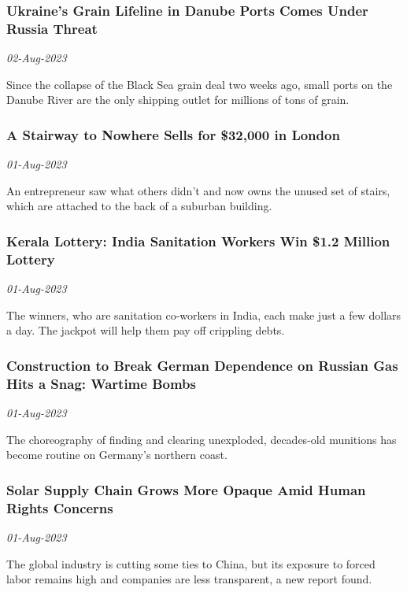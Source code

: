 \subsubsection{Ukraine’s Grain Lifeline in Danube Ports Comes Under Russia Threat \href{https://www.nytimes.com/2023/08/01/world/europe/ukraine-grain-danube-ports-russia.html}{}}
\textit{02-Aug-2023}

Since the collapse of the Black Sea grain deal two weeks ago, small ports on the Danube River are the only shipping outlet for millions of tons of grain.
\subsubsection{A Stairway to Nowhere Sells for \$32,000 in London \href{https://www.nytimes.com/2023/08/01/world/europe/stairwell-auction-25k-pounds.html}{}}
\textit{01-Aug-2023}

An entrepreneur saw what others didn’t and now owns the unused set of stairs, which are attached to the back of a suburban building.
\subsubsection{Kerala Lottery: India Sanitation Workers Win \$1.2 Million Lottery \href{https://www.nytimes.com/2023/08/01/world/asia/india-kerala-lottery-jackpot.html}{}}
\textit{01-Aug-2023}

The winners, who are sanitation co-workers in India, each make just a few dollars a day. The jackpot will help them pay off crippling debts.
\subsubsection{Construction to Break German Dependence on Russian Gas Hits a Snag: Wartime Bombs \href{https://www.nytimes.com/2023/08/01/world/europe/germany-gas-terminal-munitions.html}{}}
\textit{01-Aug-2023}

The choreography of finding and clearing unexploded, decades-old munitions has become routine on Germany’s northern coast.
\subsubsection{Solar Supply Chain Grows More Opaque Amid Human Rights Concerns \href{https://www.nytimes.com/2023/08/01/business/economy/solar-xinjiang-china-report.html}{}}
\textit{01-Aug-2023}

The global industry is cutting some ties to China, but its exposure to forced labor remains high and companies are less transparent, a new report found.
